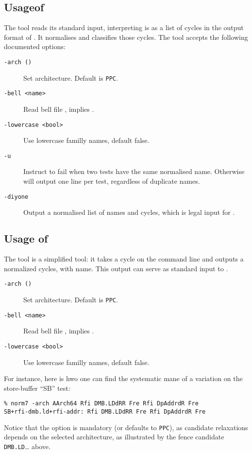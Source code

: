 \subsection{Usage\label{classify:usage}of \classify}
The tool \classify{} reads its standard input, interpreting is as
a list of cycles in the output format of \mcycles.
It normalises and classifies those cycles.
The tool \classify{} accepts the following documented options:
\begin{description}
\item[{\tt -arch (\allarch)}] Set architecture. Default is \texttt{PPC}.
\item[{\tt -bell <name>}]  Read bell file ,
implies  .
\item[{\tt -lowercase <bool>}] Use lowercase familly names, default false.
\item[{\tt -u}] Instruct \classify{} to fail when two tests have the same
normalised name. Otherwise \classify{} will output one line per test,
regardless of duplicate names.
\item[{\tt -diyone}] Output a normalised list of names and cycles,
which is legal input for \diyone.
\end{description}

\subsection{Usage\label{norm:usage} of \norm}
The tool \norm{} is a simplified \classify{} tool: it takes
a cycle on the command line and outputs a normalized cycles, with name.
This output can serve as standard input to \diyone.

\begin{description}
\item[{\tt -arch (\allarch)}] Set architecture. Default is \texttt{PPC}.
\item[{\tt -bell <name>}]  Read bell file , implies .
\item[{\tt -lowercase <bool>}] Use lowercase familly names, default false.
\end{description}

For instance, here is hwo one can find the systematic mane of a variation
on the store-buffer ``\textsf{SB}'' test:
\begin{verbatim}
% norm7 -arch AArch64 Rfi DMB.LDdRR Fre Rfi DpAddrdR Fre
SB+rfi-dmb.ld+rfi-addr: Rfi DMB.LDdRR Fre Rfi DpAddrdR Fre
\end{verbatim}
Notice that the option  is mandatory (or defaults to \texttt{PPC}),
as  candidate relaxations depends on the selected architecture, as illustrated
by the fence candidate \texttt{DMB.LD}\ldots{} above.

\endinput
